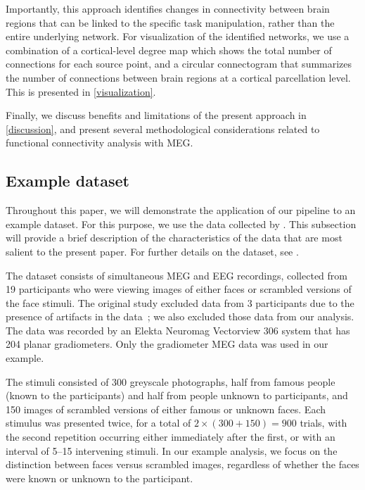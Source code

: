\documentclass[utf8]{frontiersSCNS}
\renewcommand{\cite}[1]{~\citep{#1}}
\newcommand{\textcite}[1]{\citet{#1}}
\begin{document}
Importantly, this approach identifies changes in connectivity between brain regions that can be linked to the specific task manipulation, rather than the entire underlying network.
For visualization of the identified networks, we use a combination of a cortical-level degree map which shows the total number of connections for each source point, and a circular connectogram that summarizes the number of connections between brain regions at a cortical parcellation level.
This is presented in \autoref{visualization}.

Finally, we discuss benefits and limitations of the present approach in \autoref{discussion}, and present several methodological considerations related to functional connectivity analysis with MEG.


\subsection{Example dataset}\label{dataset}
Throughout this paper, we will demonstrate the application of our pipeline to an example dataset. 
For this purpose, we use the data collected by \textcite{Wakeman2015}.
This subsection will provide a brief description of the characteristics of the data that are most salient to the present paper.
For further details on the dataset, see \textcite{Wakeman2015}.

The dataset consists of simultaneous MEG and EEG recordings, collected from 19 participants who were viewing images of either faces or scrambled versions of the face stimuli.
The original study excluded data from 3 participants due to the presence of artifacts in the data\cite{Wakeman2015}; we also excluded those data from our analysis.
The data was recorded by an Elekta Neuromag Vectorview 306 system that has 204 planar gradiometers.
Only the gradiometer MEG data was used in our example.

The stimuli consisted of 300 greyscale photographs, half from famous people (known to the participants) and half from people unknown to participants, and 150 images of scrambled versions of either famous or unknown faces.
Each stimulus was presented twice, for a total of $2 \times (300 + 150) = 900$ trials, with the second repetition occurring either immediately after the first, or with an interval of 5--15 intervening stimuli.
In our example analysis, we focus on the distinction between faces versus scrambled images, regardless of whether the faces were known or unknown to the participant.
\end{document}
